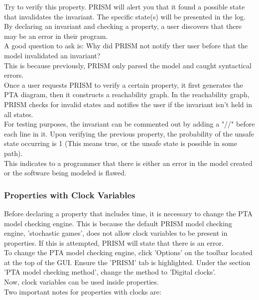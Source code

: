 \documentclass[a4paper]{article}
\begin{document}
Try to verify this property. PRISM will alert you that it found a possible state that invalidates the invariant. The specific state(s) will be presented in the log. 
\\[1\baselineskip]
By declaring an invariant and checking a property, a user discovers that there may be an error in their program.
\\[1\baselineskip]
A good question to ask is: Why did PRISM not notify ther user before that the model invalidated an invariant?
\\[1\baselineskip]
This is because previously, PRISM only parsed the model and caught syntactical errors. 
\\[1\baselineskip]
Once a user requests PRISM to verify a certain property, it first generates the PTA diagram, then it constructs a reachability graph. In the reachability graph, PRISM checks for invalid states and notifies the user if the invariant isn't held in all  states.
\\[1\baselineskip]
For testing purposes, the invariant can be commented out by adding a "//" before each line in it. Upon verifying the previous property, the probability of the unsafe state occurring is 1 (This means true, or the unsafe state is possible in some path). 
\\[1\baselineskip]
This indicates to a programmer that there is either an error in the model created or the software being modeled is flawed.


\subsubsection{Properties with Clock Variables}

Before declaring a property that includes time, it is necessary to change the PTA model checking engine. This is because the default PRISM model checking engine, 'stochastic games', does not allow clock variables to be present in properties. If this is attempted, PRISM will state that there is an error. 
\\[1\baselineskip]
To change the PTA model checking engine, click 'Options' on the toolbar located at the top of the GUI. Ensure the 'PRISM' tab is highlighted. Under the section 'PTA model checking method', change the method to 'Digital clocks'.
\\[1\baselineskip]
Now, clock variables can be used inside properties. 
\\[1\baselineskip]
Two important notes for properties with clocks are:
\end{document}

